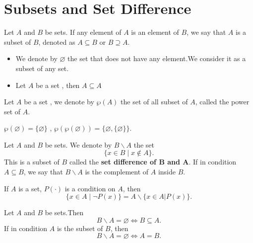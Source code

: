 \section{Subsets and Set Difference}
\begin{definitionenv}
    Let $A$ and $B$ be sets. If any element of $A$ is an element of $B$,  we say that $A$ is a subset of $B$, denoted as $A \subseteq B$ or $B\supseteq  A$.
\end{definitionenv}
\begin{exampleenv}
    \quad
   \begin{itemize}
    \item  We denote by $\varnothing $ the set that does not have any element.We consider it as a subset of any set.
   \item  Let $A$ be a set , then $A\subseteq A$
    \end{itemize}
\end{exampleenv}
\begin{definitionenv}
    Let $A$ be a set , we denote by $\wp  (A)$ the set of all subset of $A$,  called the power set of $A$.
\end{definitionenv}
\begin{exampleenv}
    $\wp (\varnothing)=\{\varnothing\}$
    , 
    $\wp (\wp (\varnothing))=\{\varnothing, \{\varnothing\}\}$.
\end{exampleenv}
\begin{definitionenv}
    Let $A$ and $B$ be sets. We denote by $B \backslash A$ the set $$\{x\in B\mid x\notin A\}.$$ This is a subset of $B$ called the \textbf{set difference of $\mathbf{B}$ and $\mathbf{A}$}.
    \newline
    If in condition $A \subseteq B$,  we say that $B\backslash A$ is the complement of $A$ inside $B$.
\end{definitionenv}
\begin{exampleenv}
    If $A$ is a set,  $P(\cdot)$ is  a condition on $A$,  then $$\{x\in A \mid \neg P(x)\}=A\backslash\{x\in A|P(x)\}.$$
\end{exampleenv}
\begin{propositionenv}
    Let $A$ and $B$ be sets.Then $$B\backslash A=\varnothing \Leftrightarrow B\subseteq A.$$
    If in condition $A$ is the subset of $B$,  then $$B\backslash A=\varnothing \Leftrightarrow A=B.$$
\end{propositionenv}


